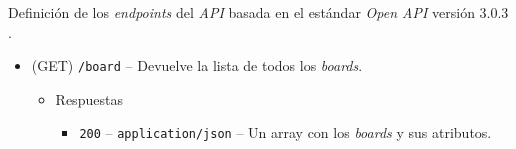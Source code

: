 \documentclass[12pt,a4paper,titlepage]{article}
\begin{document}
    Definición de los \textit{endpoints} del \textit{API} basada en el estándar \textit{Open API} versión 3.0.3 \cite{swagger:specification}.

    \begin{itemize}
        \item (GET) \texttt{/board} -- Devuelve la lista de todos los \textit{boards}.
        \begin{itemize}
            \item Respuestas
            \begin{itemize}
                \item \texttt{200} -- \texttt{application/json} -- Un array con los \textit{boards} y sus atributos.
            \end{itemize}
        \end{itemize}
    \end{itemize}

    
\end{document}
